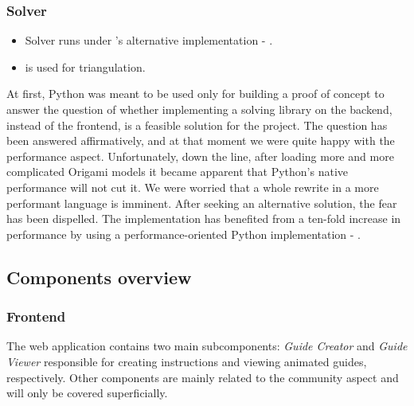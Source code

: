 \subsubsection{Solver}

\begin{itemize}
	\item Solver runs under 's alternative implementation - .
	\item {} is used for triangulation.
\end{itemize}

At first, Python was meant to be used only for building a proof of concept to answer the question of whether implementing a solving library on the backend, instead of the frontend, is a feasible solution for the project. The question has been answered affirmatively, and at that moment we were quite happy with the performance aspect. Unfortunately, down the line, after loading more and more complicated Origami models it became apparent that Python's native performance will not cut it. We were worried that a whole rewrite in a more performant language is imminent. After seeking an alternative solution, the fear has been dispelled. The implementation has benefited from a ten-fold increase in performance by using a performance-oriented Python implementation - .


\clearpage
\subsection{Components overview}

\subsubsection{Frontend}

The web application contains two main subcomponents: \textit{Guide Creator} and \textit{Guide Viewer}
responsible for creating instructions and viewing animated guides, respectively.
Other components are mainly related to the community aspect and will only be covered superficially.


